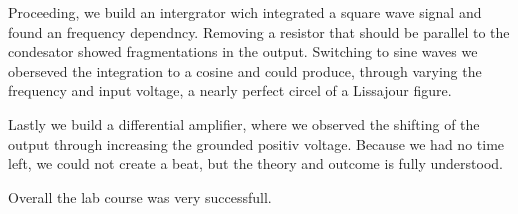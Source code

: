 \documentclass[a4paper,10pt]{article}
\numberwithin{equation}{section}
\begin{document}
\begin{multicols}{2}
  Proceeding, we build an intergrator wich integrated a square wave signal and found an frequency dependncy. Removing a resistor that should be parallel to the condesator showed fragmentations in the output. Switching to sine waves we oberseved the integration to a cosine and could produce, through varying the frequency and input voltage, a nearly perfect circel of a Lissajour figure.

  Lastly we build a differential amplifier, where we observed the shifting of the output through increasing the grounded positiv voltage. Because we had no time left, we could not create a beat, but the theory and outcome is fully understood.

  Overall the lab course was very successfull.

\end{multicols}


\clearpage
\listoffigures
\listoftables



\end{document}

